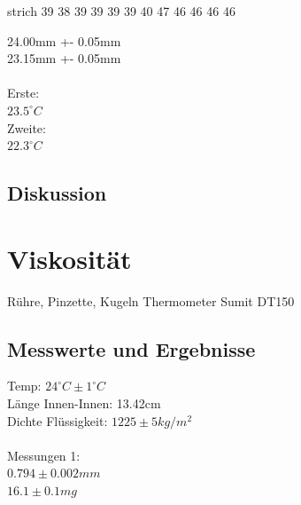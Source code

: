 \documentclass[12pt,a4paper]{article}
\begin{document}
\begin{multicols}{2}
strich
39
38
39
39
39
39
40
47
46
46
46
46



24.00mm +- 0.05mm\\
23.15mm +- 0.05mm\\
\\
Erste:\\
$23.5^{\circ}C$\\
Zweite:\\
$22.3^{\circ}C$\\
\subsection{Diskussion}


\section{Viskosität}
Rühre, Pinzette, Kugeln
Thermometer Sumit DT150\\
\subsection{Messwerte und Ergebnisse}
Temp: $24^{\circ}C \pm 1^{\circ}C$\\
Länge Innen-Innen: 13.42cm\\
Dichte Flüssigkeit: $1225 \pm 5 kg/m^2$\\
\\
Messungen 1:\\
$0.794 \pm 0.002mm$\\
$16.1 \pm 0.1 mg$\\


\end{multicols}
\end{document}
